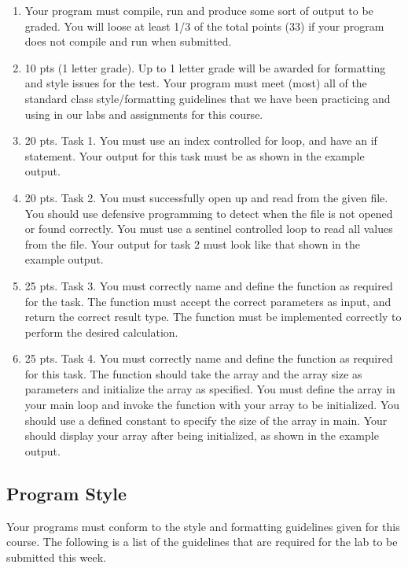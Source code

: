 \documentclass[11pt]{article}
\begin{document}
\begin{enumerate}
\item Your program must compile, run and produce some sort of output to
be graded. You will loose at least 1/3 of the total points (33) if
your program does not compile and run when submitted.
\item 10 pts (1 letter grade).  Up to 1 letter grade will be awarded for
formatting and style issues for the test.  Your program must meet
(most) all of the standard class style/formatting guidelines that
we have been practicing and using in our labs and assignments for
this course.
\item 20 pts. Task 1.  You must use an index controlled for loop, and
have an if statement.  Your output for this task must be as
shown in the example output.
\item 20 pts.  Task 2.  You must successfully open up and read from the
given file.  You should use defensive programming to detect when
the file is not opened or found correctly.  You must use a sentinel
controlled loop to read all values from the file.  Your output
for task 2 must look like that shown in the example output.
\item 25 pts. Task 3.  You must correctly name and define the function as
required for the task.  The function must accept the correct
parameters as input, and return the correct result type.  The
function must be implemented correctly to perform the desired
calculation.
\item 25 pts.  Task 4. You must correctly name and define the function as
required for this task.  The function should take the array and the
array size as parameters and initialize the array as specified.
You must define the array in your main loop and invoke the function
with your array to be initialized.  You should use a defined
constant to specify the size of the array in main.  Your should
display your array after being initialized, as shown in the example
output.
\end{enumerate}

\subsection*{Program Style}
\label{sec-4-2}

Your programs must conform to the style and formatting guidelines given for this course.
The following is a list of the guidelines that are required for the lab to be submitted
this week.
\end{document}
